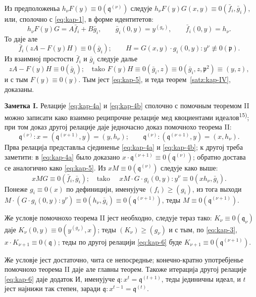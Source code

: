 \documentclass[11pt]{article}
\theoremstyle{plain}
\begin{document}
Из предположеньа $h_{\nu}F(y) \equiv 0(\mathfrak{q}^{(\nu)})$
следује
$h_{\nu}F(y)G(x,y) \equiv 0(\bar{f}_{i}, \bar{g}_{i})$, или, сполочно
с \eqref{eq:kap-1}, в форме идентитетов:
\[
h_{\nu}F(y)G = A\bar{f}_{i} + B\bar{g}_{i}, \qquad
\bar{g}_{i}(0,y) = y^{(g_{\nu})}, \qquad
\bar{f}_{i}(0,y) = h_{\nu}.
\]
То даје але
\[
\bar{f}_{i}(zA - F(y)H) \equiv 0(\bar{g}_{i}); \qquad
H = G(x,y) \cdot g_{i}(0,y) : y^{\nu} \not\equiv 0(\mathfrak{p}).
\]
Из взаимној простости $\bar{f}_{i}$ и $\bar{g}_{i}$ следује далье
\[
zA - F(y)H \equiv 0(\bar{g}_{i}); \quad \text{tako } F(y)H \equiv 0(\bar{g}_{i}, z)
\equiv 0(\bar{g}_{i}, z, \mathfrak{p}^{2}) \equiv (y, z),
\]
и с тым $F(y) \equiv 0(y)$. Тым јест \eqref{eq:kap-5}, и теда
теорем~\ref{satz:kap-IV}, доказаны.

\smallskip
\textbf{Заметка I.} Релације \eqref{eq:kap-4a} и
\eqref{eq:kap-4b} сполочно с помочным теоремом II можно записати
како взаимно реципрочне релације мед квоциентами идеалов\textsuperscript{15)};
при том доказ другој релације даје једночасно доказ помочнохо
теорема II:
\begin{equation}\label{eq:kap-6}
\mathfrak{q}^{(\nu)} : x = (\mathfrak{q}^{(\nu+1)}, y) = (y, h_{\nu}); \qquad
\mathfrak{q}^{(\nu)} : (\mathfrak{q}^{(\nu+1)}, y) = (x, h_{\nu}).
\end{equation}
Прва релација представльа сјединенье \eqref{eq:kap-4a} и
\eqref{eq:kap-4b}; к другој треба заметити: в \eqref{eq:kap-4a}
было доказано
$x \cdot \mathfrak{q}^{(\nu+1)} \equiv 0(\mathfrak{q}^{(\nu)})$;
обратно достава се аналогично како \eqref{eq:kap-5}. Из
$xM \equiv 0(\mathfrak{q}^{(\nu)})$ следује како выше:
\[
xMG \equiv 0(\bar{f}_{i}, \bar{g}_{i}); \quad \text{tako }\quad
xM \cdot G \cdot g_{i}(0,y) : y^{\nu} \equiv 0(xh_{\nu}, \bar{g}_{i}).
\]
Понеже $g_{i} \equiv 0(x)$ по дефиницији, именујуче
$(f_{i}) \geq (g_{i})$, из тога выходи
$M \cdot (G \cdot g_{i}(0,y) : y^{\nu}) \equiv 0(h_{\nu}, \bar{g}_{i})
\equiv 0(\mathfrak{q}^{(\nu+1)})$, теды
$M \equiv 0(\mathfrak{q}^{(\nu+1)})$.

Же условје помочнохо теорема II јест необходно, следује тераз тако:
$K_{\nu} \equiv 0(\mathfrak{q}_{\nu})$ даје
$K_{\nu}(0,y) \equiv 0(y^{(g_{\nu})}, x)$; теды
$(K_{\nu}) \geq (g_{\nu})$ и с тым, по \eqref{eq:kap-3},
$x \cdot K_{\nu+1} \equiv 0(\mathfrak{q})$; теды по другој релацији
\eqref{eq:kap-6} буде
$K_{\nu+1} \equiv 0(\mathfrak{q}^{(\nu+1)})$.

Же условје јест достаточно, чита се непосреднье; конечно-кратно
употребјенье помочнохо теорема II даје але главны теорем. Такоже
итерација другој релације \eqref{eq:kap-6} даје додаток И, именујуче
$\mathfrak{q} : x^{t} = \mathfrak{q}^{(t+1)}$, теды јединичны
идеал, и $t$ јест најнижи так степен, заради
$\mathfrak{q} : x^{t-1} = \mathfrak{q}^{(t)}$.
\end{document}
